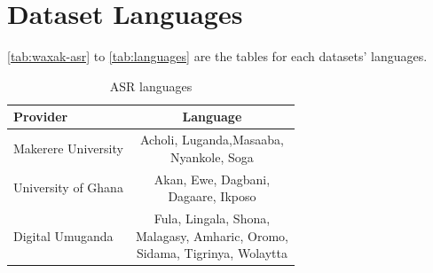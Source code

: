 \documentclass[11pt]{article} %
\begin{document}
    \section{Dataset Languages}
    \label{app:data} \autoref{tab:waxak-asr} to \ref{tab:languages} are the tables
    for each datasets' languages.
    \begin{table}[htbp]
        \centering
        \caption{\citet{waxal2026} ASR languages}
        \label{tab:waxak-asr}
        \begin{tabular}{lc}
            \toprule \textbf{Provider}           & \textbf{Language}                                                                            \\
            \midrule\midrule Makerere University & \makecell[c]{Acholi, Luganda,Masaaba, \\Nyankole, Soga}                                      \\
            \midrule University of Ghana         & \makecell[c]{Akan, Ewe, Dagbani, \\Dagaare, Ikposo}                                          \\
            \midrule Digital Umuganda            & \makecell[c]{Fula, Lingala, Shona, \\Malagasy, Amharic, Oromo, \\Sidama, Tigrinya, Wolaytta} \\
            \bottomrule
        \end{tabular}
    \end{table}
\end{document}
